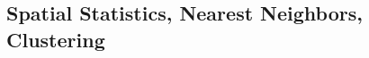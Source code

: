 \documentclass[10pt]{article}
\begin{document}








\subsection{Spatial Statistics, Nearest Neighbors, Clustering}\label{ssnn}
\end{document}

